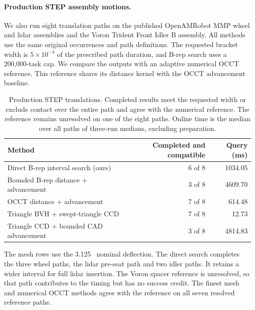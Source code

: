 \paragraph{Production STEP assembly motions.}
We also run eight translation paths on the published OpenAMRobot MMP wheel and lidar assemblies and the Voron Trident Front Idler B assembly. All methods use the same original occurrences and path definitions. The requested bracket width is $5\times10^{-4}$ of the prescribed path duration, and B-rep search uses a 200,000-task cap. We compare the outputs with an adaptive numerical OCCT reference. This reference shares its distance kernel with the OCCT advancement baseline.

\begin{table}[pos=!htbp]
\small\centering
\caption{Production STEP translations. Completed results meet the requested width or exclude contact over the entire path and agree with the numerical reference. The reference remains unresolved on one of the eight paths. Online time is the median over all paths of three-run medians, excluding preparation.}
\label{tab:production-contact}
\begin{tabular}{lrr}\toprule
Method & Completed and compatible & Query (ms) \\\midrule
Direct B-rep interval search (ours) & 6 of 8 & 1034.05 \\
Bounded B-rep distance + advancement & 3 of 8 & 4609.70 \\
OCCT distance + advancement & 7 of 8 & 614.48 \\
Triangle BVH + swept-triangle CCD & 7 of 8 & 12.73 \\
Triangle CCD + bounded CAD advancement & 3 of 8 & 4814.83 \\
\bottomrule\end{tabular}
\end{table}

The mesh rows use the 3.125~\micron{} nominal deflection. The direct search completes the three wheel paths, the lidar pre-seat path and two idler paths. It retains a wider interval for full lidar insertion. The Voron spacer reference is unresolved, so that path contributes to the timing but has no success credit. The finest mesh and numerical OCCT methods agree with the reference on all seven resolved reference paths.
